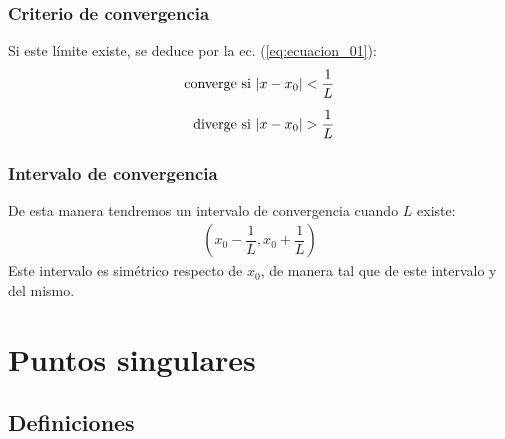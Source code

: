 \documentclass[12pt]{beamer}
\begin{document}
\begin{frame}
\frametitle{Criterio de convergencia}
Si este límite existe, se deduce por la ec. (\ref{eq:ecuacion_01}):
\pause
\begin{align}
\begin{aligned}        
\mbox{converge si } &\abs{x - x_{0}} < \dfrac{1}{L} \\[0.5em]
\mbox{diverge si } &\abs{x - x_{0}} > \dfrac{1}{L}
\end{aligned}
\label{eq:ecuacion_02}    
\end{align}
\end{frame}
\begin{frame}
\frametitle{Intervalo de convergencia}
De esta manera tendremos un intervalo de convergencia cuando $L$ existe:
\pause
\begin{align*}
\left( x_{0} - \dfrac{1}{L}, x_{0} + \dfrac{1}{L} \right)
\end{align*}
\pause
Este intervalo es simétrico respecto de $x_{0}$, de manera tal que  de este intervalo y  del mismo.
\end{frame}

\section{Puntos singulares}
\subsection{Definiciones}
\end{document}
